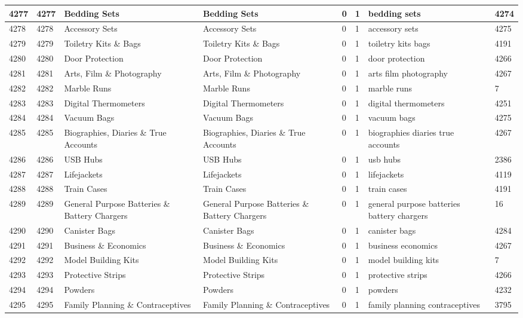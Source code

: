 \begin{longtable}{|l|l|l|l|l|l|l|l|}
4277 & 4277 & Bedding Sets & Bedding Sets & 0 & 1 & bedding sets & 4274 \\ \hline 
4278 & 4278 & Accessory Sets & Accessory Sets & 0 & 1 & accessory sets & 4275 \\ \hline 
4279 & 4279 & Toiletry Kits \& Bags & Toiletry Kits \& Bags & 0 & 1 & toiletry kits bags & 4191 \\ \hline 
4280 & 4280 & Door Protection & Door Protection & 0 & 1 & door protection & 4266 \\ \hline 
4281 & 4281 & Arts, Film \& Photography & Arts, Film \& Photography & 0 & 1 & arts film photography & 4267 \\ \hline 
4282 & 4282 & Marble Runs & Marble Runs & 0 & 1 & marble runs & 7 \\ \hline 
4283 & 4283 & Digital Thermometers & Digital Thermometers & 0 & 1 & digital thermometers & 4251 \\ \hline 
4284 & 4284 & Vacuum Bags & Vacuum Bags & 0 & 1 & vacuum bags & 4275 \\ \hline 
4285 & 4285 & Biographies, Diaries \& True Accounts & Biographies, Diaries \& True Accounts & 0 & 1 & biographies diaries true accounts & 4267 \\ \hline 
4286 & 4286 & USB Hubs & USB Hubs & 0 & 1 & usb hubs & 2386 \\ \hline 
4287 & 4287 & Lifejackets & Lifejackets & 0 & 1 & lifejackets & 4119 \\ \hline 
4288 & 4288 & Train Cases & Train Cases & 0 & 1 & train cases & 4191 \\ \hline 
4289 & 4289 & General Purpose Batteries \& Battery Chargers & General Purpose Batteries \& Battery Chargers & 0 & 1 & general purpose batteries battery chargers & 16 \\ \hline 
4290 & 4290 & Canister Bags & Canister Bags & 0 & 1 & canister bags & 4284 \\ \hline 
4291 & 4291 & Business \& Economics & Business \& Economics & 0 & 1 & business economics & 4267 \\ \hline 
4292 & 4292 & Model Building Kits & Model Building Kits & 0 & 1 & model building kits & 7 \\ \hline 
4293 & 4293 & Protective Strips & Protective Strips & 0 & 1 & protective strips & 4266 \\ \hline 
4294 & 4294 & Powders & Powders & 0 & 1 & powders & 4232 \\ \hline 
4295 & 4295 & Family Planning \& Contraceptives & Family Planning \& Contraceptives & 0 & 1 & family planning contraceptives & 3795 \\ \hline 

\end{longtable}
